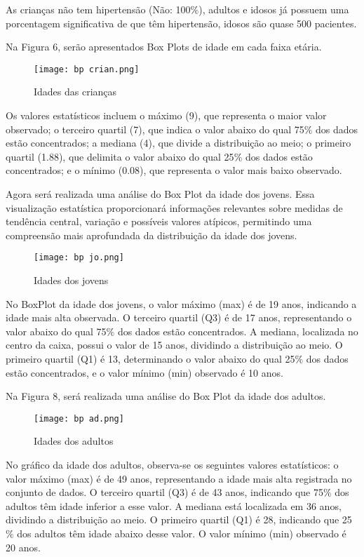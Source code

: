 \documentclass[conference]{IEEEtran}
\begin{document}
As crianças não tem hipertensão (Não: 100$\%$), adultos e idosos já possuem uma porcentagem significativa de que têm hipertensão, idosos são quase 500 pacientes.

Na Figura 6, serão apresentados Box Plots de idade em cada faixa etária.
\begin{figure}[h]
  \caption{Idades das crianças}
  \centering
  \texttt{[image: bp crian.png]}
\end{figure}

Os valores estatísticos incluem o máximo (9), que representa o maior valor observado; o terceiro quartil (7), que indica o valor abaixo do qual 75$\%$ dos dados estão concentrados; a mediana (4), que divide a distribuição ao meio; o primeiro quartil (1.88), que delimita o valor abaixo do qual 25$\%$ dos dados estão concentrados; e o mínimo (0.08), que representa o valor mais baixo observado.

Agora será realizada uma análise do Box Plot da idade dos jovens. Essa visualização estatística proporcionará informações relevantes sobre medidas de tendência central, variação e possíveis valores atípicos, permitindo uma compreensão mais aprofundada da distribuição da idade dos jovens.

\begin{figure}[h]
  \caption{Idades dos jovens}
  \centering
  \texttt{[image: bp jo.png]}
\end{figure}

No BoxPlot da idade dos jovens, o valor máximo (max) é de 19 anos, indicando a idade mais alta observada. O terceiro quartil (Q3) é de 17 anos, representando o valor abaixo do qual 75$\%$ dos dados estão concentrados. A mediana, localizada no centro da caixa, possui o valor de 15 anos, dividindo a distribuição ao meio. O primeiro quartil (Q1) é 13, determinando o valor abaixo do qual 25$\%$ dos dados estão concentrados, e o valor mínimo (min) observado é 10 anos. 

Na Figura 8, será realizada uma análise do Box Plot da idade dos adultos.

\begin{figure}[h]
  \caption{Idades dos adultos}
  \centering
  \texttt{[image: bp ad.png]}
\end{figure}

No gráfico da idade dos adultos, observa-se os seguintes valores estatísticos: o valor máximo (max) é de 49 anos, representando a idade mais alta registrada no conjunto de dados. O terceiro quartil (Q3) é de 43 anos, indicando que 75$\%$ dos adultos têm idade inferior a esse valor. A mediana está localizada em 36 anos, dividindo a distribuição ao meio. O primeiro quartil (Q1) é 28, indicando que 25$\%$ dos adultos têm idade abaixo desse valor. O valor mínimo (min) observado é 20 anos.
\end{document}
